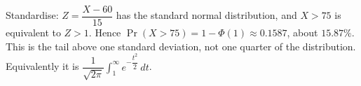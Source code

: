 Standardise: $Z = \dfrac{X-60}{15}$ has the standard normal distribution, and $X>75$ is equivalent to $Z>1$. Hence $\boxed{\Pr(X>75)=1-\Phi(1)\approx0.1587}$, about $15.87\%$. This is the tail above one standard deviation, not one quarter of the distribution. Equivalently it is $\dfrac{1}{\sqrt{2\pi}} \int_1^\infty e^{- \dfrac{t^2}{2}} \, d t$.
